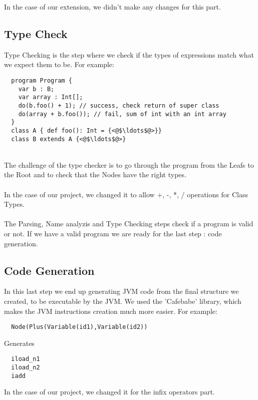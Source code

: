 \textnormal{In the case of our extension, we didn't make any changes for this
  part. }

\subsection{Type Check}

\textnormal{Type Checking is the step where we check if the types of expressions
  match what we expect them to be. For example: }

\begin{lstlisting}
  program Program {
    var b : B;
    var array : Int[];
    do(b.foo() + 1); // success, check return of super class
    do(array + b.foo()); // fail, sum of int with an int array
  }
  class A { def foo(): Int = {<@$\ldots$@>}}
  class B extends A {<@$\ldots$@>}
\end{lstlisting}
\\
\textnormal{The challenge of the type checker is to go through the program from
  the Leafs to the Root and to check that the Nodes have the right types.\\}
\\
\textnormal{In the case of our project, we changed it to allow +, -, *, /
  operations for Class Types.\\}
\\
\textnormal{The Parsing, Name analyzis and Type Checking steps check if a
  program is valid or not. If we have a valid program we are ready for the last
  step : code generation.\\}

\vfill
\subsection{Code Generation}
\textnormal{In this last step we end up generating JVM code from the final
  structure we created, to be executable by the JVM. We used the 'Cafebabe'
  library, which makes the JVM instructions creation much more easier. For
  example:}

\begin{lstlisting}
  Node(Plus(Variable(id1),Variable(id2))
\end{lstlisting}
\textnormal{Generates}
\begin{lstlisting}
  iload_n1
  iload_n2
  iadd
\end{lstlisting}

\textnormal{In the case of our project, we changed it for the infix operators
  part.}


